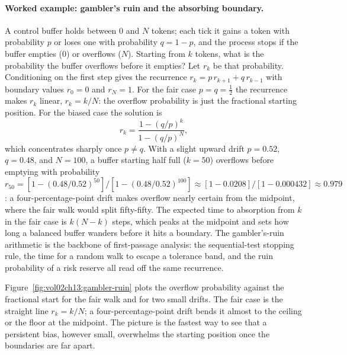 \paragraph{Worked example: gambler's ruin and the absorbing boundary.}
A control buffer holds between $0$ and $N$ tokens; each tick it gains a
token with probability $p$ or loses one with probability $q = 1 - p$,
and the process stops if the buffer empties ($0$) or overflows ($N$).
Starting from $k$ tokens, what is the probability the buffer overflows
before it empties? Let $r_{k}$ be that probability. Conditioning on the
first step gives the recurrence $r_{k} = p\,r_{k+1} + q\,r_{k-1}$ with
boundary values $r_{0} = 0$ and $r_{N} = 1$. For the fair case $p = q =
\tfrac12$ the recurrence makes $r_{k}$ linear, $r_{k} = k/N$: the
overflow probability is just the fractional starting position. For the
biased case the solution is
\[
r_{k} = \frac{1 - (q/p)^{k}}{1 - (q/p)^{N}},
\]
which concentrates sharply once $p \neq q$. With a slight upward drift
$p = 0.52$, $q = 0.48$, and $N = 100$, a buffer starting half full
($k = 50$) overflows before emptying with probability $r_{50} =
[1 - (0.48/0.52)^{50}]/[1 - (0.48/0.52)^{100}] \approx
[1 - 0.0208]/[1 - 0.000432] \approx 0.979$: a four-percentage-point
drift makes overflow nearly certain from the midpoint, where the fair
walk would split fifty-fifty. The expected time to absorption from $k$
in the fair case is $k(N - k)$ steps, which peaks at the midpoint and
sets how long a balanced buffer wanders before it hits a boundary. The
gambler's-ruin arithmetic is the backbone of first-passage analysis: the
sequential-test stopping rule, the time for a random walk to escape a
tolerance band, and the ruin probability of a risk reserve all read off
the same recurrence.



Figure~\ref{fig:vol02ch13:gambler-ruin} plots the overflow probability
against the fractional start for the fair walk and for two small drifts.
The fair case is the straight line $r_{k} = k/N$; a four-percentage-point
drift bends it almost to the ceiling or the floor at the midpoint. The
picture is the fastest way to see that a persistent bias, however small,
overwhelms the starting position once the boundaries are far apart.

